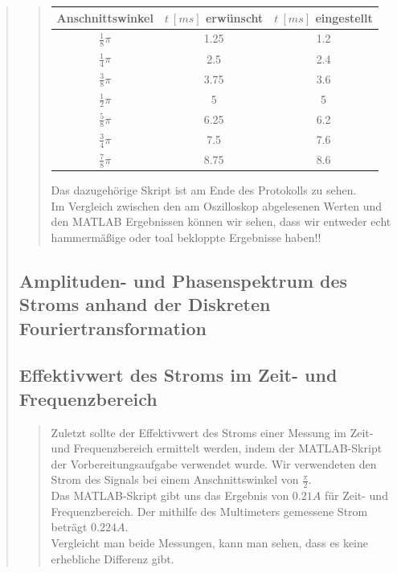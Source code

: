 \begin{quote}
\begin{quote}
\begin{center}
\begin{tabular}{|c|c|c|}
                   \hline
                   Anschnittswinkel & $t\ [ms]$ erwünscht & $t\ [ms]$
                   eingestellt\\ \hline 
                   $\frac{1}{8} \pi$ & 1.25 & 1.2 \\ \hline
                   $\frac{1}{4} \pi$ & 2.5 & 2.4 \\ \hline
                   $\frac{3}{8} \pi$ & 3.75 & 3.6 \\ \hline
                   $\frac{1}{2} \pi$ & 5 & 5 \\ \hline
                   $\frac{5}{8} \pi$ & 6.25 & 6.2 \\ \hline
                   $\frac{3}{4} \pi$ & 7.5 & 7.6 \\ \hline
                   $\frac{7}{8} \pi$ & 8.75 & 8.6 \\ \hline                         
           
                 \end{tabular}
       \end{center}        
       
    Das dazugehörige Skript ist am Ende des Protokolls zu sehen.\\
    
    Im Vergleich zwischen den am Oszilloskop abgelesenen Werten und den MATLAB
    Ergebnissen können wir sehen, dass wir entweder echt hammermäßige oder toal
    bekloppte Ergebnisse haben!!
	\end{quote}
	
	\subsection{Amplituden- und Phasenspektrum des Stroms anhand der Diskreten
	Fouriertransformation}
	\begin{quote}
	\end{quote}
	
	\subsection{Effektivwert des Stroms im Zeit- und Frequenzbereich}
	\begin{quote}
	Zuletzt sollte der Effektivwert des Stroms einer Messung im Zeit- und
	Frequenzbereich ermittelt werden, indem der MATLAB-Skript der
	Vorbereitungsaufgabe verwendet wurde. Wir verwendeten den Strom des Signals bei
	einem Anschnittswinkel von $\frac{\pi}{2}$.\\
	Das MATLAB-Skript gibt uns das Ergebnis von $0.21 A$ für Zeit- und
	Frequenzbereich. Der mithilfe des Multimeters gemessene Strom beträgt $0.224
	A$.\\
	
	Vergleicht man beide Messungen, kann man sehen, dass es keine erhebliche
	Differenz gibt.
	
	 
	\end{quote}
\end{quote}

